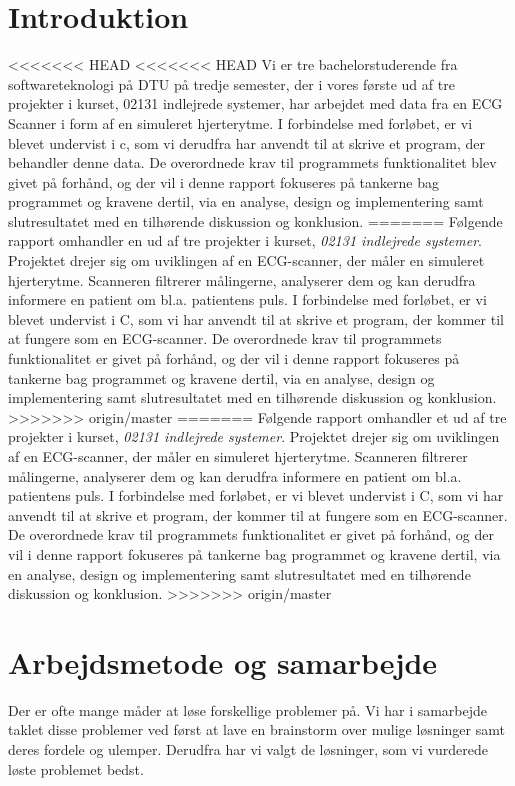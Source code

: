 \documentclass{article}
\begin{document}
\section{Introduktion}
<<<<<<< HEAD
<<<<<<< HEAD
Vi er tre bachelorstuderende fra softwareteknologi på DTU på tredje semester, der i vores første ud af tre projekter i kurset, 02131 indlejrede systemer, har arbejdet med data fra en ECG Scanner i form af en simuleret hjerterytme. I forbindelse med forløbet, er vi blevet undervist i c, som vi derudfra har anvendt til at skrive et program, der behandler denne data. De overordnede krav til programmets funktionalitet blev givet på forhånd, og der vil i denne rapport fokuseres på tankerne bag programmet og kravene dertil, via en analyse, design og implementering samt slutresultatet med en tilhørende diskussion og konklusion.
=======
Følgende rapport omhandler en ud af tre projekter i kurset, \textit{02131 indlejrede systemer}. Projektet drejer sig om uviklingen af en ECG-scanner, der måler en simuleret hjerterytme. Scanneren filtrerer målingerne, analyserer dem og kan derudfra informere en patient om bl.a. patientens puls. I forbindelse med forløbet, er vi blevet undervist i C, som vi har anvendt til at skrive et program, der kommer til at fungere som en ECG-scanner. De overordnede krav til programmets funktionalitet er givet på forhånd, og der vil i denne rapport fokuseres på tankerne bag programmet og kravene dertil, via en analyse, design og implementering samt slutresultatet med en tilhørende diskussion og konklusion.
>>>>>>> origin/master
=======
Følgende rapport omhandler et ud af tre projekter i kurset, \textit{02131 indlejrede systemer}. Projektet drejer sig om uviklingen af en ECG-scanner, der måler en simuleret hjerterytme. Scanneren filtrerer målingerne, analyserer dem og kan derudfra informere en patient om bl.a. patientens puls. I forbindelse med forløbet, er vi blevet undervist i C, som vi har anvendt til at skrive et program, der kommer til at fungere som en ECG-scanner. De overordnede krav til programmets funktionalitet er givet på forhånd, og der vil i denne rapport fokuseres på tankerne bag programmet og kravene dertil, via en analyse, design og implementering samt slutresultatet med en tilhørende diskussion og konklusion.
>>>>>>> origin/master


\newpage
\section{Arbejdsmetode og samarbejde}
Der er ofte mange måder at løse forskellige problemer på. Vi har i samarbejde taklet disse problemer ved først at lave en brainstorm over mulige løsninger samt deres fordele og ulemper. Derudfra har vi valgt de løsninger, som vi vurderede løste problemet bedst.
\end{document}

